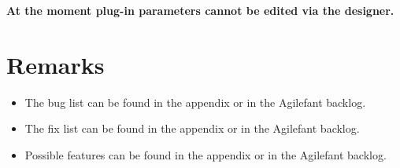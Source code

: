 \begin{tcolorbox}[colback=white]
\textbf{
At the moment plug-in parameters cannot be edited via the designer.
}
\end{tcolorbox}


\section{Remarks}
\begin{itemize}
\item The bug list can be found in the appendix or in the Agilefant backlog.
\item The fix list can be found in the appendix or in the Agilefant backlog.
\item Possible features can be found in the appendix or in the Agilefant backlog.
\end{itemize}

